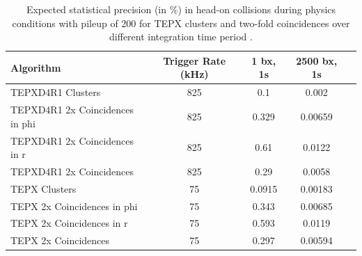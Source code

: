 \begin{table}[htbp]
\centering
\caption[Expected stat. precision of TEPX under high pileup]{Expected statistical precision (in $\%$) in head-on collisions during physics conditions with pileup of 200 for TEPX clusters and two-fold coincidences over different integration time period \cite{Collaboration:275907420}.}
\begin{small} %
\begin{tabular}{lcccc}
Algorithm & Trigger Rate (kHz) & 1 bx, 1s & 2500 bx, 1s\\
\hline
TEPXD4R1 Clusters & 825 & 0.1 & 0.002  \\
TEPXD4R1 2x Coincidences in phi & 825 & 0.329 & 0.00659 \\
TEPXD4R1 2x Coincidences in r & 825 & 0.61 & 0.0122  \\
TEPXD4R1 2x Coincidences & 825 & 0.29 & 0.0058  \\
TEPX Clusters & 75 & 0.0915 & 0.00183  \\
TEPX 2x Coincidences in phi & 75 & 0.343 & 0.00685 \\
TEPX 2x Coincidences in r & 75 & 0.593 & 0.0119  \\
TEPX 2x Coincidences & 75 & 0.297 & 0.00594  \\
\end{tabular}
\end{small}
\end{table}


